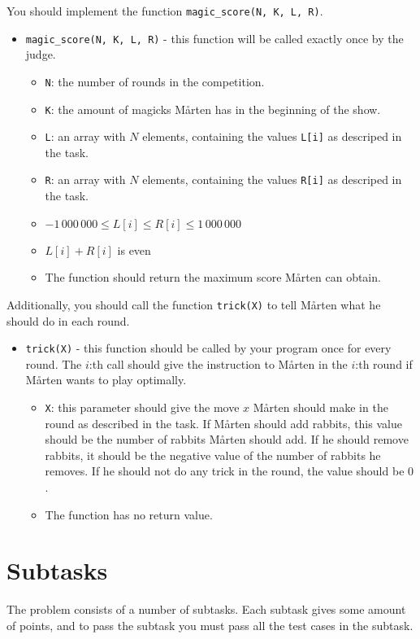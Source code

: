 You should implement the function \texttt{magic\_score(N, K, L, R)}.
\begin{itemize}
  \item \texttt{magic\_score(N, K, L, R)} - this function will be called exactly once by the judge.
  \begin{itemize}
    \item \texttt{N}: the number of rounds in the competition.
    \item \texttt{K}: the amount of magicks Mårten has in the beginning of the show.
    \item \texttt{L}: an array with $N$ elements, containing the values \texttt{L[i]} as descriped in the task.
    \item \texttt{R}: an array with $N$ elements, containing the values \texttt{R[i]} as descriped in the task.
    \item $-1\,000\,000 \le L[i] \le R[i] \le 1\,000\,000$
    \item $L[i] + R[i]$ is even
    \item The function should return the maximum score Mårten can obtain.
  \end{itemize}

\end{itemize}

Additionally, you should call the function \texttt{trick(X)} to tell Mårten what he should do in each round.
\begin{itemize}
  \item \texttt{trick(X)} - this function should be called by your program once for every round. The $i$:th call should give the instruction
    to Mårten in the $i$:th round if Mårten wants to play optimally.
  \begin{itemize}
    \item \texttt{X}: this parameter should give the move $x$ Mårten should make in the round as described in the task. If Mårten should add rabbits,
      this value should be the number of rabbits Mårten should add. If he should remove rabbits, it should be the negative
      value of the number of rabbits he removes. If he should not do any trick in the round, the value should be $0$. 
    \item The function has no return value.
  \end{itemize}
\end{itemize}


\section*{Subtasks}
The problem consists of a number of subtasks. Each subtask gives some amount of points, and to pass
the subtask you must pass all the test cases in the subtask.

